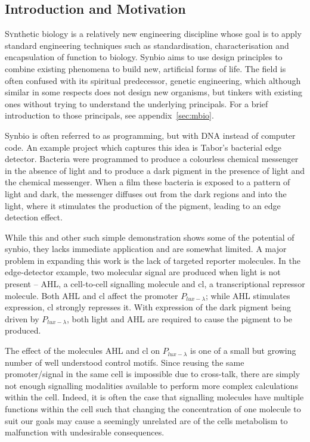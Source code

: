 \documentclass[twoside,a4paper]{article}
\begin{document}
\begin{multicols}{2} %

\section{Introduction and Motivation}

\lettrine[nindent=0em,lines=3]{S} ynthetic biology is a relatively new
engineering discipline whose goal is to apply standard engineering techniques
such as standardisation, characterisation and encapsulation of function to 
biology.
Synbio aims to use design principles to combine existing phenomena to build 
new, artificial forms of life.
The field is often confused with its spiritual predecessor, genetic 
engineering, which although similar in some respects does not design new
organisms, but tinkers with existing ones without trying to understand the
underlying principals.
For a brief introduction to those principals, see appendix~\ref{sec:mbio}.

Synbio is often referred to as programming, but with DNA instead of computer
code.
An example project which captures this idea is Tabor's bacterial edge
detector\cite{edgeDetector}.
Bacteria were programmed to produce a colourless chemical messenger in the 
absence of light and to produce a dark pigment in the presence of light and the
chemical messenger.
When a film these bacteria is exposed to a pattern of light and dark, the
messenger diffuses out from the dark regions and into the light, where it
stimulates the production of the pigment, leading to an edge detection effect.

While this and other such simple demonstration shows some of the potential 
of synbio, they lacks immediate application and are somewhat limited.
A major problem in expanding this work is the lack of targeted reporter
molecules.
In the edge-detector example, two molecular signal are produced when light is not 
present -- AHL, a cell-to-cell signalling molecule and cl, a
transcriptional repressor molecule.
Both AHL and cl affect the promoter $P_{lux-\lambda}$; while AHL stimulates
expression, cl strongly represses it.
With expression of the dark pigment being driven by $P_{lux-\lambda}$, 
both light and AHL are required to cause the pigment to be produced.

The effect of the molecules AHL and cl on $P_{lux-\lambda}$ is one of a small
but growing number of well understood control motifs.
Since reusing the same promoter/signal in the same cell is impossible due to 
cross-talk, there are simply not enough signalling modalities available to
perform more complex calculations within the cell.
Indeed, it is often the case that signalling molecules have multiple functions
within the cell such that changing the concentration of one molecule to suit
our goals may cause a seemingly unrelated are of the cells metabolism to
malfunction with undesirable consequences.


\end{multicols}
\end{document}
